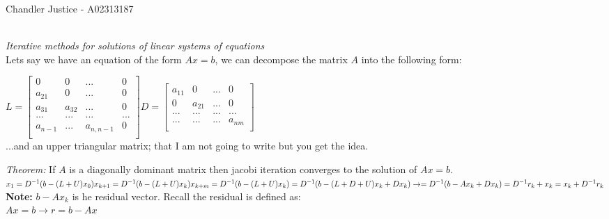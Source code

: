 \documentclass[10pt, AMS Euler]{article}
\begin{document}
\begin{flushright}
Chandler Justice - A02313187
\end{flushright}
\noindent \underline{\hspace{3in}}\\

\textit{Iterative methods for solutions of linear systems of equations}\\

Lets say we have an equation of the form $Ax =b$, we can decompose the matrix $A$ into the following form:

\begin{center}
  $
  L =
  \begin{bmatrix}
    0 & 0 & ... & 0\\
    a_{21} & 0 & ... & 0\\
    a_{31} & a_{32} & ... & 0\\
    ... & ... & ... & ...\\
    a_{n-1} & ... & a_{n, n-1} & 0\\
  \end{bmatrix}
  D = 
  \begin{bmatrix}
    a_{11} & 0 & ... & 0\\
    0 & a_{21} & ... & 0\\
    ... & ... & ... & ...\\
    ... & ... & ... & a_{nm}\\
  \end{bmatrix}
  $\\
  ...and an upper triangular matrix; that I am not going to write but you get the idea.\\
\end{center}

\textit{Theorem:} If $A$ is a diagonally dominant matrix then jacobi iteration converges to the solution of $Ax = b$.\\

$
x_1 = D^{-1}(b - (L + U)x_0)\\
x_{k+1} = D^{-1}(b - (L + U)x_k)\\
x_{k+m} = D^{-1}(b - (L + U)x_k) = D^{-1}(b - (L + D + U)x_k + Dx_k)\\
\rightarrow = D^{-1}(b - Ax_k + Dx_k) = D^{-1} r_k + x_k = x_k + D^{-1}r_k\\
$\\


\textbf{Note:} $b - Ax_k$ is he residual vector. Recall the residual is defined as:\\
$Ax = b \rightarrow r = b - Ax$\\
\end{document}
